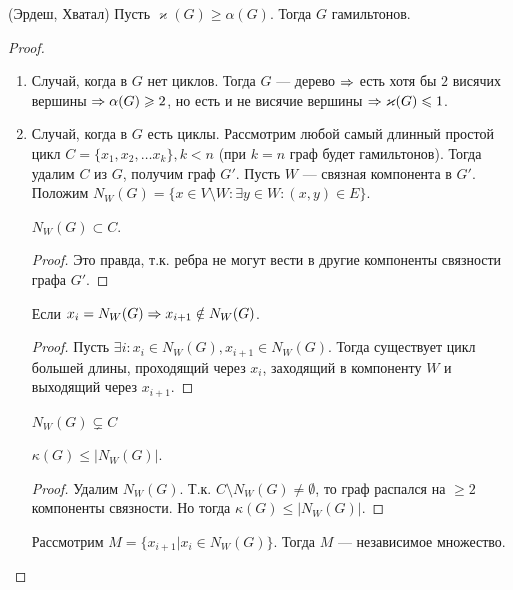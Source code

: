 \begin{theorem}{(Эрдеш, Хватал)}
    Пусть \(\varkappa(G) \ge \alpha(G)\). Тогда \(G\) гамильтонов. 
\end{theorem}
\begin{proof}
    \begin{enumerate}
        \item Случай, когда в \(G\) нет циклов. Тогда \(G\) --- дерево \(\Rightarrow\) есть хотя бы \(2\) висячих вершины \(\Rightarrow \alpha(G) \geqslant 2\), но есть и не висячие вершины \(\Rightarrow \varkappa(G) \leqslant 1\).
        \item Случай, когда в \(G\) есть циклы. Рассмотрим любой самый длинный простой цикл \(C = \{x_1, x_2, \dots x_k\}, k < n\) (при \(k = n\) граф будет гамильтонов). Тогда удалим \(C\) из \(G\), получим граф \(G'\). Пусть \(W\) --- связная компонента в \(G'\). Положим \(N_W(G) = \{x \in V \setminus W: \exists y \in W: (x, y) \in E\}\).
        \begin{proposition}
            \(N_W(G) \subset C\).
        \end{proposition}
        \begin{proof}
            Это правда, т.к. ребра не могут вести в другие компоненты связности графа \(G'\).
        \end{proof}
        \begin{proposition}
            Если \(x_i = N_W(G) \Rightarrow x_{i + 1} \notin N_W(G)\).
        \end{proposition}
        \begin{proof}
            Пусть \(\exists i: x_i \in N_W(G), x_{i + 1} \in N_W(G)\). Тогда существует цикл большей длины, проходящий через \(x_i\), заходящий в компоненту \(W\) и выходящий через \(x_{i + 1}\).
        \end{proof}
        \begin{corollary}
            \(N_W(G) \subsetneq C\)
        \end{corollary}
        \begin{proposition}
            \(\kappa(G) \le |N_W(G)|\).
        \end{proposition}
        \begin{proof}
            Удалим \(N_W(G)\). Т.к. \(C \setminus N_W(G) \ne \emptyset\), то граф распался на \(\ge 2\) компоненты связности. Но тогда \(\kappa(G) \le |N_W(G)|\).
        \end{proof}
        \begin{proposition}
            Рассмотрим \(M = \{x_{i + 1} | x_i \in N_W(G)\}\). Тогда \(M\) --- независимое множество.

\end{proposition}
\end{enumerate}
\end{proof}
